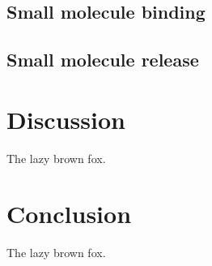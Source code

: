 \begin{refsection}
\subsection{Small molecule binding}


\subsection{Small molecule release}

\section{Discussion}
The lazy brown fox.

\section{Conclusion}
The lazy brown fox.


\printbibliography[heading=subbibliography]

\end{refsection}
